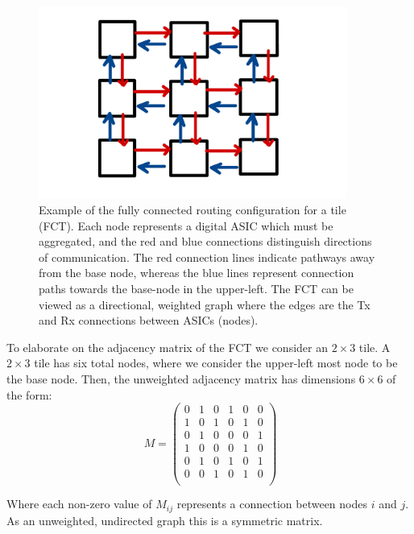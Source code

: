 \begin{figure}[]
\centering
\includegraphics[width=0.9\textwidth]{images/Broadcast.pdf}
\caption{Example of the fully connected routing configuration for a tile (FCT).
Each node represents a digital ASIC which must be aggregated, and the red and blue connections distinguish directions of communication.
The red connection lines indicate pathways away from the base node, whereas the blue lines represent connection paths towards the base-node in the upper-left.
The FCT can be viewed as a directional, weighted graph where the edges are the Tx and Rx connections between ASICs (nodes).
}
\label{fig:fc_tile}
\end{figure}

To elaborate on the adjacency matrix of the FCT we consider an $2\times 3$ tile.
A $2\times 3$ tile has six total nodes, where we consider the upper-left most node to be the base node.
Then, the unweighted adjacency matrix has dimensions $6\times6$ of the form:
\begin{equation}~\label{eq:adjacency_matr}
M =
 \begin{pmatrix}
 0 & 1 & 0 & 1 & 0 & 0 \\
 1 & 0 & 1 & 0 & 1 & 0 \\
 0 & 1 & 0 & 0 & 0 & 1 \\
 1 & 0 & 0 & 0 & 1 & 0 \\
 0 & 1 & 0 & 1 & 0 & 1 \\
 0 & 0 & 1 & 0 & 1 & 0 \\
 \end{pmatrix}
\end{equation}

Where each non-zero value of $M_{ij}$ represents a connection between nodes $i$ and $j$.
As an unweighted, undirected graph this is a symmetric matrix.

